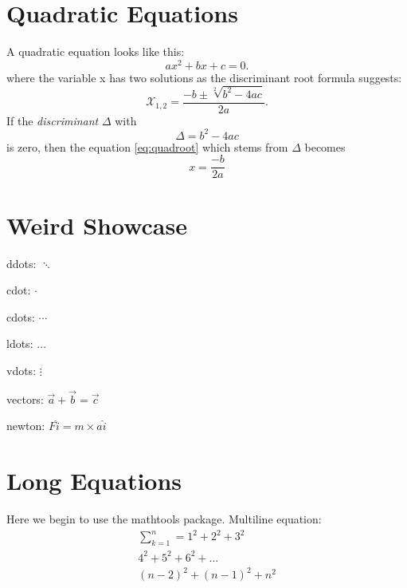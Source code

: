 \documentclass{article}
\begin{document}
    \sffamily

    \section*{Quadratic Equations}
    A quadratic equation looks like this:
    \begin{equation}    %
        ax^2 + bx + c = 0. \label{eq:quad}
    \end{equation}
    where the variable x has two solutions as the discriminant root formula suggests:
    \begin{equation}
        \mathcal{X}_{1,2} = \frac{-b \pm \sqrt[2]{b^2 - 4ac}}{2a}. \label{eq:quadroot}
    \end{equation}
    If the \emph{discriminant} \(\Delta\) with \[ \Delta = b^2 - 4ac \] is zero, then
    the equation \ref{eq:quadroot} which stems from $\Delta$ becomes \[ x = \frac{-b}{2a} \]

    \section*{Weird Showcase}
    ddots: $\ddots$

    cdot: $\cdot$

    cdots: $\cdots$

    ldots: $\ldots$

    vdots: $\vdots$

    vectors: $\vec{a}+\vec b = \vec c$

    newton: $F\hat{i}=m \times a\hat{i}$

    \section*{Long Equations}
    Here we begin to use the mathtools package.
    Multiline equation:
    \begin{multline}
        \sum_{k=1}^n = 1^2 + 2^2 + 3^2 \\
        4^2 + 5^2 + 6^2 + \ldots \\
        (n-2)^2 + (n-1)^2 + n^2
    \end{multline}
\end{document}
